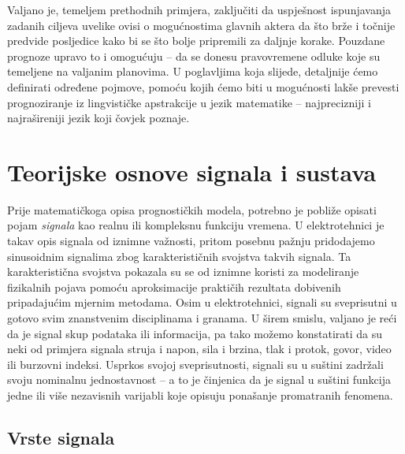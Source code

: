 \documentclass[a4paper,12pt,oneside]{memoir}
\begin{document}
            Valjano je, temeljem prethodnih primjera, zaključiti da uspješnost ispunjavanja zadanih ciljeva uvelike ovisi o mogućnostima glavnih aktera da što brže i točnije predvide posljedice kako bi se što bolje pripremili za daljnje korake. Pouzdane prognoze upravo to i omogućuju -- da se donesu pravovremene odluke koje su temeljene na valjanim planovima. U poglavljima koja slijede, detaljnije ćemo definirati određene pojmove, pomoću kojih ćemo biti u mogućnosti lakše prevesti prognoziranje iz lingvističke apstrakcije u jezik matematike -- najprecizniji i najrašireniji jezik koji čovjek poznaje.


    \chapter{Teorijske osnove signala i sustava}

        Prije matematičkoga opisa prognostičkih modela, potrebno je pobliže opisati pojam \textit{signala} kao realnu ili kompleksnu funkciju vremena. U elektrotehnici je takav opis signala od iznimne važnosti, pritom posebnu pažnju pridodajemo sinusoidnim signalima zbog karakterističnih svojstva takvih signala. Ta karakteristična svojstva pokazala su se od iznimne koristi za modeliranje fizikalnih pojava pomoću aproksimacije praktičih rezultata dobivenih pripadajućim mjernim metodama. Osim u elektrotehnici, signali su sveprisutni u gotovo svim znanstvenim disciplinama i granama. U širem smislu, valjano je reći da je signal skup podataka ili informacija, pa tako možemo konstatirati da su neki od primjera signala struja i napon, sila i brzina, tlak i protok, govor, video ili burzovni indeksi. Usprkos svojoj sveprisutnosti, signali su u suštini zadržali svoju nominalnu jednostavnost -- a to je činjenica da je signal u suštini funkcija jedne ili više nezavisnih varijabli koje opisuju ponašanje promatranih fenomena. 

        
        \section{Vrste signala}
        
\end{document}
